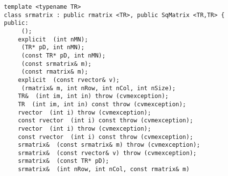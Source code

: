 \bigskip
\noindent
\verb"template <typename TR>"\\
\verb"class srmatrix : public rmatrix <TR>, public SqMatrix <TR,TR> {"\\
\verb"public:"\\
\verb"    "\verb" ();"\\
\verb"    explicit "\verb" (int nMN);"\\
\verb"    "\verb" (TR* pD, int nMN);"\\
\verb"    "\verb" (const TR* pD, int nMN);"\\
\verb"    "\verb" (const srmatrix& m);"\\
\verb"    "\verb" (const rmatrix& m);"\\
\verb"    explicit "\verb" (const rvector& v);"\\
\verb"    "\verb" (rmatrix& m, int nRow, int nCol, int nSize);"\\
\verb"    TR& "\verb" (int im, int in) throw (cvmexception);"\\
\verb"    TR "\verb" (int im, int in) const throw (cvmexception);"\\
\verb"    rvector "\verb" (int i) throw (cvmexception);"\\
\verb"    const rvector "\verb" (int i) const throw (cvmexception);"\\
\verb"    rvector "\verb" (int i) throw (cvmexception);"\\
\verb"    const rvector "\verb" (int i) const throw (cvmexception);"\\
\verb"    srmatrix& "\verb" (const srmatrix& m) throw (cvmexception);"\\
\verb"    srmatrix& "\verb" (const rvector& v) throw (cvmexception);"\\
\verb"    srmatrix& "\verb" (const TR* pD);"\\
\verb"    srmatrix& "\verb" (int nRow, int nCol, const rmatrix& m)"\\
